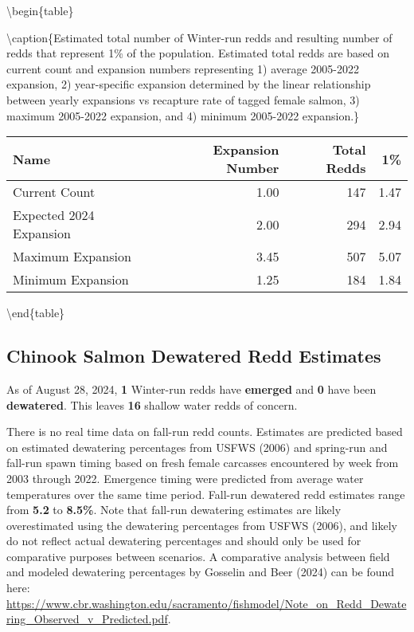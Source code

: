 \documentclass[
]{article}
\begin{document}
\textbackslash begin\{table\}

\textbackslash caption\{\label{tab:unnamed-chunk-5}Estimated total
number of Winter-run redds and resulting number of redds that represent
1\% of the population. Estimated total redds are based on current count
and expansion numbers representing 1) average 2005-2022 expansion, 2)
year-specific expansion determined by the linear relationship between
yearly expansions vs recapture rate of tagged female salmon, 3) maximum
2005-2022 expansion, and 4) minimum 2005-2022 expansion.\} \centering

\begin{tabular}[t]{l|r|r|r}
\hline
Name & Expansion Number & Total Redds & 1\%\\
\hline
Current Count & 1.00 & 147 & 1.47\\
\hline
Expected 2024 Expansion & 2.00 & 294 & 2.94\\
\hline
Maximum Expansion & 3.45 & 507 & 5.07\\
\hline
Minimum Expansion & 1.25 & 184 & 1.84\\
\hline
\end{tabular}

\textbackslash end\{table\}

\hypertarget{chinook-salmon-dewatered-redd-estimates}{%
\subsection{Chinook Salmon Dewatered Redd
Estimates}\label{chinook-salmon-dewatered-redd-estimates}}

As of August 28, 2024, \textbf{1} Winter-run redds have \textbf{emerged}
and \textbf{0} have been \textbf{dewatered}. This leaves \textbf{16}
shallow water redds of concern.

There is no real time data on fall-run redd counts. Estimates are
predicted based on estimated dewatering percentages from USFWS (2006)
and spring-run and fall-run spawn timing based on fresh female carcasses
encountered by week from 2003 through 2022. Emergence timing were
predicted from average water temperatures over the same time period.
Fall-run dewatered redd estimates range from \textbf{5.2} to
\textbf{8.5\%}. Note that fall-run dewatering estimates are likely
overestimated using the dewatering percentages from USFWS (2006), and
likely do not reflect actual dewatering percentages and should only be
used for comparative purposes between scenarios. A comparative analysis
between field and modeled dewatering percentages by Gosselin and Beer
(2024) can be found here:
\url{https://www.cbr.washington.edu/sacramento/fishmodel/Note_on_Redd_Dewatering_Observed_v_Predicted.pdf}.
\end{document}
